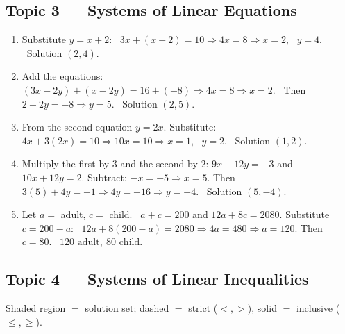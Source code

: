 \documentclass[11pt]{article}
\begin{document}
\subsection*{\color{FangBlue}Topic 3 --- Systems of Linear Equations}
\begin{enumerate}[leftmargin=2em,itemsep=6pt]
  \item Substitute $y=x+2$: \ $3x + (x+2) = 10 \Rightarrow 4x = 8 \Rightarrow x = 2$, \ $y = 4.$
        \ Solution $\boxed{(2,4)}.$
  \item Add the equations: $(3x+2y)+(x-2y) = 16 + (-8) \Rightarrow 4x = 8 \Rightarrow x = 2.$
        \ Then $2 - 2y = -8 \Rightarrow y = 5.$ \ Solution $\boxed{(2,5)}.$
  \item From the second equation $y = 2x$. Substitute: $4x + 3(2x) = 10 \Rightarrow 10x = 10 \Rightarrow x = 1$,
        \ $y = 2.$ \ Solution $\boxed{(1,2)}.$
  \item Multiply the first by $3$ and the second by $2$: $9x+12y=-3$ and $10x+12y=2.$
        Subtract: $-x = -5 \Rightarrow x = 5.$ Then $3(5)+4y=-1 \Rightarrow 4y = -16 \Rightarrow y = -4.$
        \ Solution $\boxed{(5,-4)}.$
  \item Let $a=$ adult, $c=$ child. \ $a + c = 200$ and $12a + 8c = 2080.$
        Substitute $c = 200 - a$: \ $12a + 8(200 - a) = 2080 \Rightarrow 4a = 480 \Rightarrow a = 120.$
        Then $c = 80.$ \ $\boxed{120 \text{ adult},\ 80 \text{ child}}.$
\end{enumerate}

\subsection*{\color{FangBlue}Topic 4 --- Systems of Linear Inequalities}
Shaded region $=$ solution set; dashed $=$ strict ($<,>$), solid $=$ inclusive ($\le,\ge$).
\end{document}
